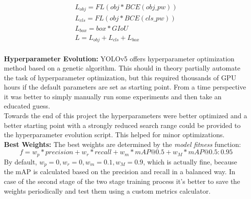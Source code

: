 \begin{equation}
  \begin{array}{l}
    L_{obj} = FL(obj * BCE(obj\_pw)) \\
    L_{cls} = FL(obj * BCE(cls\_pw)) \\
    L_{box} = box * GIoU \\
    L = L_{obj} + L_{cls} + L_{box} \\
  \end{array}
\end{equation}



\textbf{Hyperparameter Evolution:}
YOLOv5 offers hyperparameter optimization method based on a genetic algorithm. This should in theory partially automate the task of hyperparameter optimization, but this required thousands of GPU hours if the default parameters are set as starting point. From a time perspective it was better to simply manually run some experiments and then take an educated guess. \\
Towards the end of this project the hyperparameters were better optimized and a better starting point with a  strongly reduced search range could be provided to the hyperparameter evolution script. This helped for minor optimizations. \\

\textbf{Best Weights:}
The best weights are determined by the \textit{model fitness} function:
\begin{equation}
f = w_p * precision + w_r * recall + w_m * mAP@0.5 + w_M * mAP@0.5:0.95
\end{equation}
By default, $w_p=0, w_r=0, w_m=0.1, w_M=0.9$, which is actually fine, because the mAP is calculated based on the precision and recall in a balanced way. In case of the second stage of the two stage training process it's better to save the weights periodically and test them using a custom metrics calculator. \\

